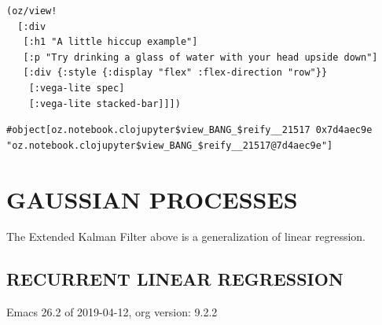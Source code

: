 \documentclass[10pt,oneside,x11names]{article}
\begin{document}
\begin{verbatim}
(oz/view!
  [:div
   [:h1 "A little hiccup example"]
   [:p "Try drinking a glass of water with your head upside down"]
   [:div {:style {:display "flex" :flex-direction "row"}}
    [:vega-lite spec]
    [:vega-lite stacked-bar]]])
\end{verbatim}

\begin{verbatim}
#object[oz.notebook.clojupyter$view_BANG_$reify__21517 0x7d4aec9e "oz.notebook.clojupyter$view_BANG_$reify__21517@7d4aec9e"]
\end{verbatim}

\section{GAUSSIAN PROCESSES}
\label{gaussian-processes}
The Extended Kalman Filter above is a generalization of linear
regression.

\subsection{RECURRENT LINEAR REGRESSION}
\label{recurrent-linear-regression}
Emacs 26.2 of 2019-04-12, org version: 9.2.2
\end{document}
